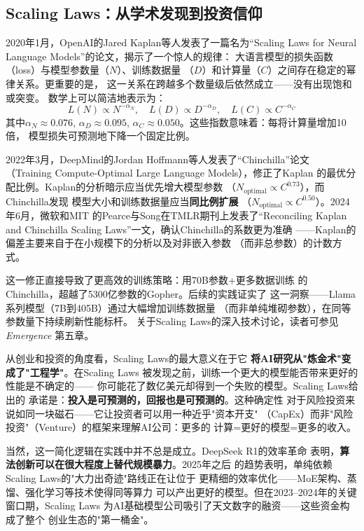 \subsection{Scaling Laws：从学术发现到投资信仰}

2020年1月，OpenAI的Jared Kaplan等人发表了一篇名为``Scaling Laws
for Neural Language Models''的论文，揭示了一个惊人的规律：
大语言模型的损失函数（loss）与模型参数量（$N$）、训练数据量
（$D$）和计算量（$C$）之间存在稳定的幂律关系。更重要的是，
这一关系在跨越多个数量级后依然成立——没有出现饱和或突变。
数学上可以简洁地表示为：
\[
  L(N) \propto N^{-\alpha_N}, \quad
  L(D) \propto D^{-\alpha_D}, \quad
  L(C) \propto C^{-\alpha_C}
\]
其中$\alpha_N \approx 0.076$, $\alpha_D \approx 0.095$,
$\alpha_C \approx 0.050$。这些指数意味着：每将计算量增加10倍，
模型损失可预测地下降一个固定比例。

2022年3月，DeepMind的Jordan Hoffmann等人发表了``Chinchilla''论文
（Training Compute-Optimal Large Language Models），修正了Kaplan
的最优分配比例。Kaplan的分析暗示应当优先增大模型参数
（$N_\text{optimal} \propto C^{0.73}$），而Chinchilla发现
模型大小和训练数据量应当\textbf{同比例扩展}
（$N_\text{optimal} \propto C^{0.50}$）。2024年6月，微软和MIT
的Pearce与Song在TMLR期刊上发表了``Reconciling Kaplan and
Chinchilla Scaling Laws''一文，确认Chinchilla的系数更为准确
——Kaplan的偏差主要来自于在小规模下的分析以及对非嵌入参数
（而非总参数）的计数方式。

这一修正直接导致了更高效的训练策略：用70B参数+更多数据训练
的Chinchilla，超越了5300亿参数的Gopher。后续的实践证实了
这一洞察——Llama系列模型（7B到405B）通过大幅增加训练数据量
（而非单纯堆砌参数），在同等参数量下持续刷新性能标杆。
关于Scaling Laws的深入技术讨论，读者可参见\textit{Emergence}
第五章。

从创业和投资的角度看，Scaling Laws的最大意义在于它
\textbf{将AI研究从"炼金术"变成了"工程学"}。在Scaling Laws
被发现之前，训练一个更大的模型能否带来更好的性能是不确定的——
你可能花了数亿美元却得到一个失败的模型。Scaling Laws给出的
承诺是：\textbf{投入是可预测的，回报也是可预测的}。这种确定性
对于风险投资来说如同一块磁石——它让投资者可以用一种近乎"资本开支"
（CapEx）而非"风险投资"（Venture）的框架来理解AI公司：更多的
计算=更好的模型=更多的收入。

当然，这一简化逻辑在实践中并不总是成立。DeepSeek R1的效率革命
表明，\textbf{算法创新可以在很大程度上替代规模暴力}。2025年之后
的趋势表明，单纯依赖Scaling Laws的"大力出奇迹"路线正在让位于
更精细的效率优化——MoE架构、蒸馏、强化学习等技术使得同等算力
可以产出更好的模型。但在2023--2024年的关键窗口期，Scaling Laws
为AI基础模型公司吸引了天文数字的融资——这些资金构成了整个
创业生态的"第一桶金"。

